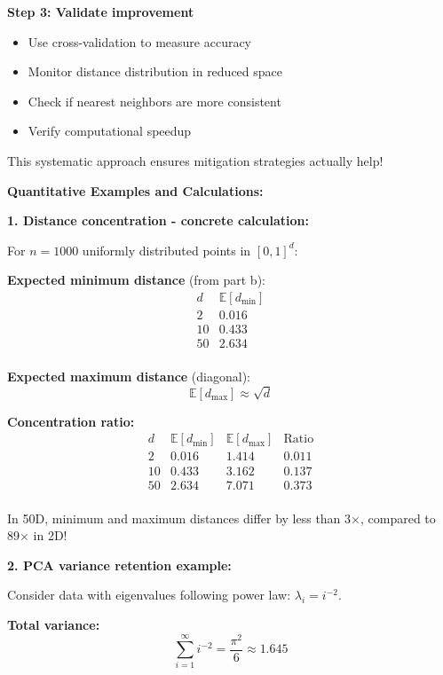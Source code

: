 \documentclass[12pt]{article}
\begin{document}
\begin{explanation}
\textbf{Step 3: Validate improvement}
\begin{itemize}
    \item Use cross-validation to measure accuracy
    \item Monitor distance distribution in reduced space
    \item Check if nearest neighbors are more consistent
    \item Verify computational speedup
\end{itemize}

This systematic approach ensures mitigation strategies actually help!
\end{explanation}

\begin{computation}
\textbf{Quantitative Examples and Calculations:}

\textbf{1. Distance concentration - concrete calculation:}

For \(n=1000\) uniformly distributed points in \([0,1]^d\):

\textbf{Expected minimum distance} (from part b):
\[
\begin{array}{c|c}
d & \mathbb{E}[d_{\min}] \\
\hline
2 & 0.016 \\
10 & 0.433 \\
50 & 2.634 \\
\end{array}
\]

\textbf{Expected maximum distance} (diagonal):
\[
\mathbb{E}[d_{\max}] \approx \sqrt{d}
\]

\textbf{Concentration ratio:}
\[
\begin{array}{c|c|c|c}
d & \mathbb{E}[d_{\min}] & \mathbb{E}[d_{\max}] & \text{Ratio} \\
\hline
2 & 0.016 & 1.414 & 0.011 \\
10 & 0.433 & 3.162 & 0.137 \\
50 & 2.634 & 7.071 & 0.373 \\
\end{array}
\]

In 50D, minimum and maximum distances differ by less than 3×, compared to 89× in 2D!

\textbf{2. PCA variance retention example:}

Consider data with eigenvalues following power law: \(\lambda_i = i^{-2}\).

\textbf{Total variance:}
\[
\sum_{i=1}^{\infty} i^{-2} = \frac{\pi^2}{6} \approx 1.645
\]


\end{computation}
\end{document}
